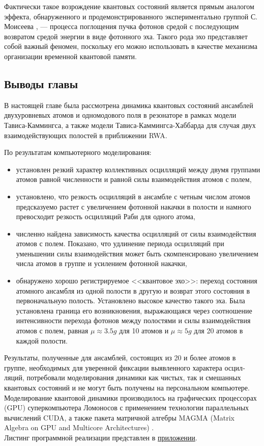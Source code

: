 Фактически такое возрождение квантовых состояний является прямым аналогом эффекта, обнаруженного и продемонстрированного экспериментально группой С. Моисеева \cite{moiseev_1,moiseev_2,moiseev_3,moiseev_4}, --- процесса поглощения пучка фотонов средой с последующим возвратом средой энергии в виде фотонного эха. Такого рода эхо представляет собой важный феномен, поскольку его можно использовать в качестве механизма организации временной квантовой памяти.

\clearpage
\subsection{Выводы главы}
В настоящей главе была рассмотрена динамика квантовых состояний ансамблей двухуровневых атомов и одномодового поля в резонаторе в рамках модели Тависа-Каммингса, а также модели Тависа-Каммингса-Хаббарда для случая двух взаимодействующих полостей в приближении RWA.

По результатам компьютерного моделирования:
\begin{itemize}
	\item{установлен резкий характер коллективных осцилляций между двумя группами атомов равной численности и равной силы взаимодействия атомов с полем,}
	\item{установлено, что резкость осцилляций в ансамбле с четным числом атомов предсказуемо растет с увеличением фотонной накачки в полости и намного превосходит резкость осцилляций Раби для одного атома},
	\item{численно найдена зависимость качества осцилляций от силы взаимодействия атомов с полем. Показано, что удлинение периода осцилляций при уменьшении силы взаимодействия может быть скомпенсировано увеличением числа атомов в группе и усилением фотонной накачки,}
	\item{обнаружено хорошо регистрируемое <<квантовое эхо>>: переход состояния атомного ансамбля из одной полости в другую и возврат этого
состояния в первоначальную полость. Установлено высокое качество такого эха. Была установлена граница его возникновения, выражающаяся через соотношение интенсивности перехода фотонов между полостями и силы взаимодействия атомов с полем, равная $\mu \approx 3.5g$ для 10 атомов и $\mu \approx 5g$ для 20 атомов в каждой полости.}
\end{itemize}

\indent Результаты, полученные для ансамблей, состоящих из 20 и более атомов в группе, необходимых для уверенной фиксации выявленного характера осцил­ляций, потребовали моделирования динамики как чистых, так и смешанных квантовых состояний и не могут быть получены на персональном компью­тере. Моделирование квантовой динамики производилось на графических процессорах (GPU) суперкомпьютера Ломоносов с применением технологии па­раллельных вычислений CUDA, а также пакета матричной алгебры MAGMA (Matrix Algebra on GPU and Multicore Architectures) \cite{magma}.
\\[12pt]
\noindent Листинг программной реализации представлен в \hyperref[appendix]{приложении}.
